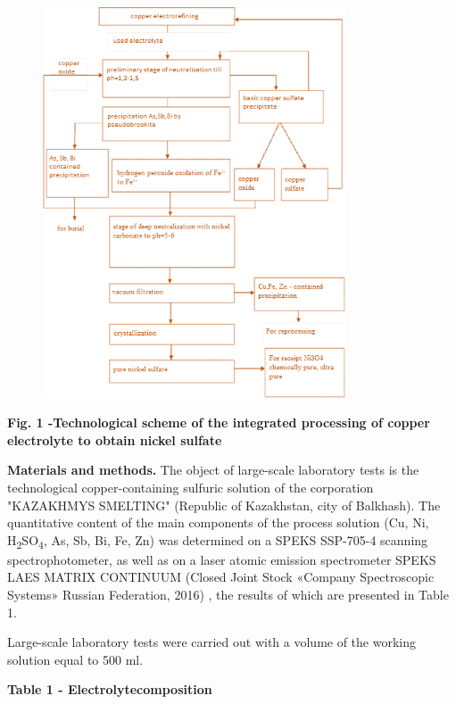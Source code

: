 \begin{figure}[H]
	\centering
	\includegraphics[width=0.8\textwidth]{media/chem2/image17}
	\caption*{}
\end{figure}


{\bfseries Fig. 1 -Technological scheme of the integrated processing of
copper electrolyte to obtain nickel sulfate}

{\bfseries Materials and methods.} The object of large-scale laboratory
tests is the technological copper-containing sulfuric solution of the
corporation "KAZAKHMYS SMELTING" (Republic of Kazakhstan, city of
Balkhash). The quantitative content of the main components of the
process solution (Cu, Ni, H\textsubscript{2}SO\textsubscript{4}, As, Sb,
Bi, Fe, Zn) was determined on a SPEKS SSP-705-4 scanning
spectrophotometer, as well as on a laser atomic emission spectrometer
SPEKS LAES MATRIX CONTINUUM (Closed Joint Stock «Company Spectroscopic
Systems» Russian Federation, 2016) , the results of which are presented
in Table 1.

Large-scale laboratory tests were carried out with a volume of the
working solution equal to 500 ml.

{\bfseries Table 1 - Electrolytecomposition}

